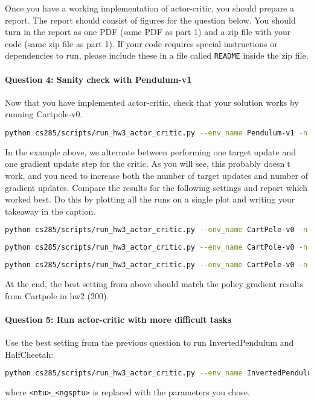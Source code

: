 Once you have a working implementation of actor-critic, you should prepare a report. The report should consist of figures for the question below. You should turn in the report as one PDF (same PDF as part 1) and a zip file with your code (same zip file as part 1). If your code requires special instructions or dependencies to run, please include these in a file called \verb+README+ inside the zip file.

\paragraph{Question 4: Sanity check with Pendulum-v1}
Now that you have implemented actor-critic, check that your solution works by running Cartpole-v0. \\
\begin{lstlisting}[language=bash,breaklines=true]
python cs285/scripts/run_hw3_actor_critic.py --env_name Pendulum-v1 -n 100 -b 1000 --exp_name q4_ac_1_1 -ntu 1 -ngsptu 1
\end{lstlisting}
In the example above, we alternate between performing one target update and one gradient update step for the critic. As you will see, this probably doesn't work, and you need to increase both the number of target updates and number of gradient updates. Compare the results for the following settings and report which worked best. Do this by plotting all the runs on a single plot and writing your takeaway in the caption.
\begin{lstlisting}[language=bash,breaklines=true]
python cs285/scripts/run_hw3_actor_critic.py --env_name CartPole-v0 -n 100 -b 1000 --exp_name q4_100_1 -ntu 100 -ngsptu 1
\end{lstlisting}
\begin{lstlisting}[language=bash,breaklines=true]
python cs285/scripts/run_hw3_actor_critic.py --env_name CartPole-v0 -n 100 -b 1000 --exp_name q4_1_100 -ntu 1 -ngsptu 100
\end{lstlisting}
\begin{lstlisting}[language=bash,breaklines=true]
python cs285/scripts/run_hw3_actor_critic.py --env_name CartPole-v0 -n 100 -b 1000 --exp_name q4_10_10 -ntu 10 -ngsptu 10
\end{lstlisting}
At the end, the best setting from above should match the policy gradient results from Cartpole in hw2 (200).

\paragraph{Question 5: Run actor-critic with more difficult tasks}
Use the best setting from the previous question to run InvertedPendulum and HalfCheetah:
\begin{lstlisting}[language=bash,breaklines=true]
python cs285/scripts/run_hw3_actor_critic.py --env_name InvertedPendulum-v4 --ep_len 1000 --discount 0.95 -n 100 -l 2 -s 64 -b 5000 -lr 0.01 --exp_name q5_<ntu>_<ngsptu> -ntu <> -ngsptu <>
\end{lstlisting}
where \texttt{<ntu>\_<ngsptu>} is replaced with the parameters you chose.

